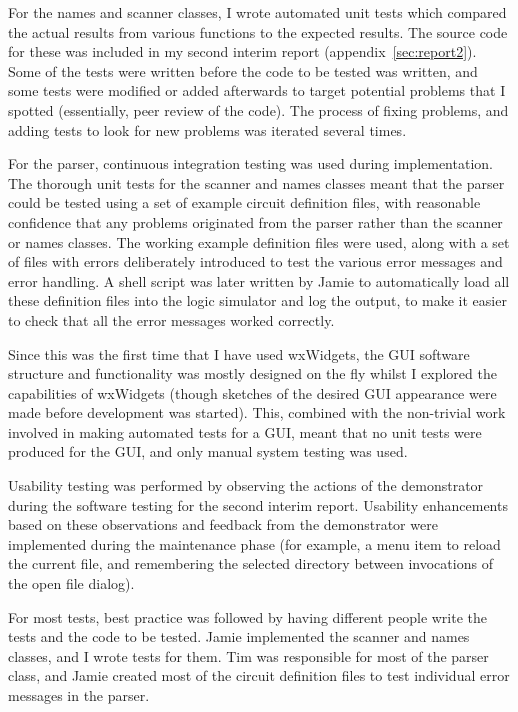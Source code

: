 \documentclass[a4paper,10pt]{article}
\begin{document}
For the names and scanner classes, I wrote automated unit tests which compared the actual results from various functions to the expected results. The source code for these was included in my second interim report (appendix~\ref{sec:report2}). Some of the tests were written before the code to be tested was written, and some tests were modified or added afterwards to target potential problems that I spotted (essentially, peer review of the code). The process of fixing problems, and adding tests to look for new problems was iterated several times. 

For the parser, continuous integration testing was used during implementation. The thorough unit tests for the scanner and names classes meant that the parser could be tested using a set of example circuit definition files, with reasonable confidence that any problems originated from the parser rather than the scanner or names classes. The working example definition files were used, along with a set of files with errors deliberately introduced to test the various error messages and error handling. A shell script was later written by Jamie to automatically load all these definition files into the logic simulator and log the output, to make it easier to check that all the error messages worked correctly. 

Since this was the first time that I have used wxWidgets, the GUI software structure and functionality was mostly designed on the fly whilst I explored the capabilities of wxWidgets (though sketches of the desired GUI appearance were made before development was started). This, combined with the non-trivial work involved in making automated tests for a GUI, meant that no unit tests were produced for the GUI, and only manual system testing was used. 

Usability testing was performed by observing the actions of the demonstrator during the software testing for the second interim report. Usability enhancements based on these observations and feedback from the demonstrator were implemented during the maintenance phase (for example, a menu item to reload the current file, and remembering the selected directory between invocations of the open file dialog). 

For most tests, best practice was followed by having different people write the tests and the code to be tested. Jamie implemented the scanner and names classes, and I wrote tests for them. Tim was responsible for most of the parser class, and Jamie created most of the circuit definition files to test individual error messages in the parser.  
\end{document}
